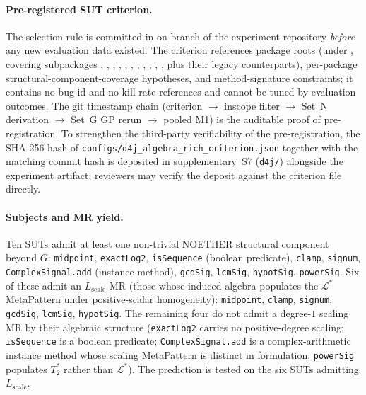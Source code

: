 \documentclass[acmsmall,screen,review]{acmart}
\begin{document}
\paragraph{Pre-registered SUT criterion.}
The selection rule is committed in
 on branch
 of the experiment repository
\emph{before} any new evaluation data existed. The criterion
references package roots (under , covering subpackages , , , , , , , , , , , plus their  legacy counterparts), per-package
structural-component-coverage hypotheses, and method-signature constraints; it
contains no bug-id and no kill-rate references and cannot be tuned by
evaluation outcomes. The git timestamp chain (criterion
$\rightarrow$ inscope filter $\rightarrow$ Set~N derivation
$\rightarrow$ Set~G GP rerun $\rightarrow$ pooled M1) is the
auditable proof of pre-registration. To strengthen the third-party
verifiability of the pre-registration, the SHA-256 hash of
\texttt{configs/d4j\_algebra\_rich\_criterion.json} together with
the matching commit hash is deposited in supplementary~S7 (\texttt{d4j/})
alongside the experiment artifact; reviewers may verify the deposit
against the criterion file directly.

\paragraph{Subjects and MR yield.}
Ten SUTs admit at least one non-trivial NOETHER structural component beyond $G$:
\texttt{midpoint}, \texttt{exactLog2}, \texttt{isSequence} (boolean
predicate), \texttt{clamp}, \texttt{signum},
\texttt{ComplexSignal.add} (instance method), \texttt{gcdSig},
\texttt{lcmSig}, \texttt{hypotSig}, \texttt{powerSig}. Six of these
admit an $L_{\mathrm{scale}}$ MR (those whose induced algebra
populates the $\mathcal{L}^{*}$ MetaPattern under positive-scalar
homogeneity): \texttt{midpoint}, \texttt{clamp}, \texttt{signum},
\texttt{gcdSig}, \texttt{lcmSig}, \texttt{hypotSig}. The remaining
four do not admit a degree-$1$ scaling MR by their algebraic structure
(\texttt{exactLog2} carries no positive-degree scaling;
\texttt{isSequence} is a boolean predicate; \texttt{ComplexSignal.add}
is a complex-arithmetic instance method whose scaling MetaPattern is
distinct in formulation; \texttt{powerSig} populates $T^{*}_{2}$
rather than $\mathcal{L}^{*}$). The prediction is tested on the six
SUTs admitting $L_{\mathrm{scale}}$.
\end{document}
